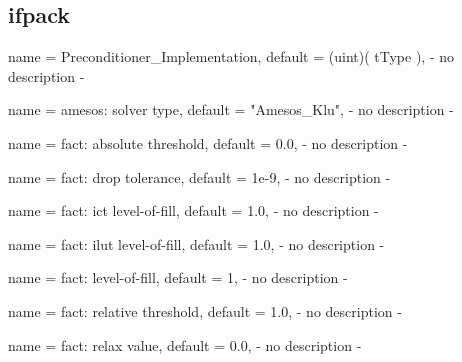 \subsection{ifpack}

\begin{parameter}{
    name    = {Preconditioner_Implementation},
    default = {(uint)( tType )},
}
- no description -
\end{parameter}

\begin{parameter}{
    name    = {amesos: solver type},
    default = {"Amesos_Klu"},
}
- no description -
\end{parameter}

\begin{parameter}{
    name    = {fact: absolute threshold},
    default = {0.0},
}
- no description -
\end{parameter}

\begin{parameter}{
    name    = {fact: drop tolerance},
    default = {1e-9},
}
- no description -
\end{parameter}

\begin{parameter}{
    name    = {fact: ict level-of-fill},
    default = {1.0},
}
- no description -
\end{parameter}

\begin{parameter}{
    name    = {fact: ilut level-of-fill},
    default = {1.0},
}
- no description -
\end{parameter}

\begin{parameter}{
    name    = {fact: level-of-fill},
    default = {1},
}
- no description -
\end{parameter}

\begin{parameter}{
    name    = {fact: relative threshold},
    default = {1.0},
}
- no description -
\end{parameter}

\begin{parameter}{
    name    = {fact: relax value},
    default = {0.0},
}
- no description -
\end{parameter}

